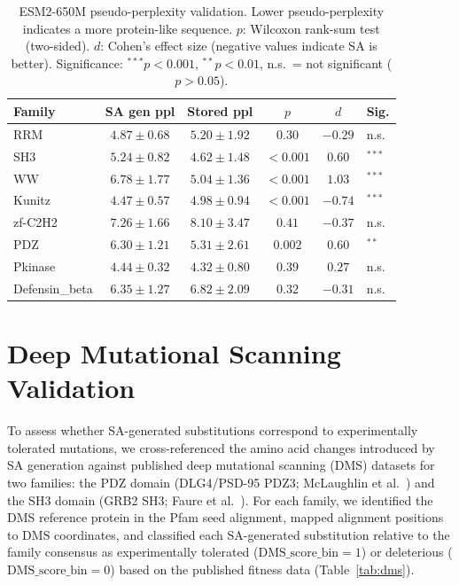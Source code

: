 \documentclass[10pt]{article}
\begin{document}
\begin{table}[ht]
\centering
\caption{ESM2-650M pseudo-perplexity validation. Lower pseudo-perplexity indicates a more protein-like sequence. $p$: Wilcoxon rank-sum test (two-sided). $d$: Cohen's effect size (negative values indicate SA is better). Significance: $^{***}p < 0.001$, $^{**}p < 0.01$, n.s.\ = not significant ($p > 0.05$).}
\label{tab:esm2}
\small
\begin{tabular}{@{}lccccl@{}}
\toprule
Family & SA gen ppl & Stored ppl & $p$ & $d$ & Sig. \\
\midrule
RRM            & $4.87 \pm 0.68$ & $5.20 \pm 1.92$ & $0.30$    & $-0.29$ & n.s. \\
SH3            & $5.24 \pm 0.82$ & $4.62 \pm 1.48$ & $<0.001$  & $0.60$  & $^{***}$ \\
WW             & $6.78 \pm 1.77$ & $5.04 \pm 1.36$ & $<0.001$  & $1.03$  & $^{***}$ \\
Kunitz         & $4.47 \pm 0.57$ & $4.98 \pm 0.94$ & $<0.001$  & $-0.74$ & $^{***}$ \\
zf-C2H2        & $7.26 \pm 1.66$ & $8.10 \pm 3.47$ & $0.41$    & $-0.37$ & n.s. \\
PDZ            & $6.30 \pm 1.21$ & $5.31 \pm 2.61$ & $0.002$   & $0.60$  & $^{**}$ \\
Pkinase        & $4.44 \pm 0.32$ & $4.32 \pm 0.80$ & $0.39$    & $0.27$  & n.s. \\
Defensin\_beta & $6.35 \pm 1.27$ & $6.82 \pm 2.09$ & $0.32$    & $-0.31$ & n.s. \\
\bottomrule
\end{tabular}
\end{table}

\section{Deep Mutational Scanning Validation}\label{si:dms}

To assess whether SA-generated substitutions correspond to experimentally tolerated mutations, we cross-referenced the amino acid changes introduced by SA generation against published deep mutational scanning (DMS) datasets for two families: the PDZ domain (DLG4/PSD-95 PDZ3; McLaughlin et al.~\cite{mclaughlinSpatialArchitecture2012}) and the SH3 domain (GRB2 SH3; Faure et al.~\cite{faureDoubleDMS2022}). For each family, we identified the DMS reference protein in the Pfam seed alignment, mapped alignment positions to DMS coordinates, and classified each SA-generated substitution relative to the family consensus as experimentally tolerated ($\mathrm{DMS\_score\_bin}{=}1$) or deleterious ($\mathrm{DMS\_score\_bin}{=}0$) based on the published fitness data (Table~\ref{tab:dms}).
\end{document}
